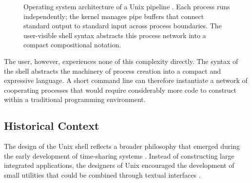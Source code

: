 \documentclass[11pt]{article}
\theoremstyle{definition}
\begin{document}
\begin{figure}[h]
\centering
{}
\caption{Operating system architecture of a Unix pipeline \cite{ritchie1974}.
Each process runs independently; the kernel manages pipe buffers that
connect standard output to standard input across process boundaries.
The user-visible shell syntax abstracts this process network into a
compact compositional notation.}
\label{fig:os_pipeline}
\end{figure}

The user, however, experiences none of this complexity directly. The
syntax of the shell abstracts the machinery of process creation into a
compact and expressive language. A short command line can therefore
instantiate a network of cooperating processes that would require
considerably more code to construct within a traditional programming
environment.

\subsection{Historical Context}

The design of the Unix shell reflects a broader philosophy that emerged
during the early development of time-sharing systems \cite{ritchie1974}.
Instead of constructing large integrated applications, the designers of
Unix encouraged the development of small utilities that could be
combined through textual interfaces \cite{mcilroy1978,kernighan1978}.
\end{document}
